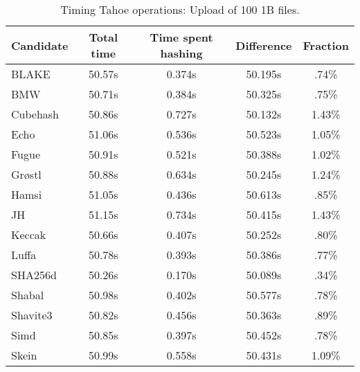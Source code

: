 \begin{table}[h]
  \centering
  \begin{tabular}{ | l | c | c | c | c | }
    \hline
    Candidate & Total time & Time spent hashing & Difference & Fraction \\ \hline
    BLAKE     &  50.57s  &  0.374s  &  50.195s  &  .74\%   \\  \hline
    BMW       &  50.71s  &  0.384s  &  50.325s  &  .75\%   \\  \hline
    Cubehash  &  50.86s  &  0.727s  &  50.132s  &  1.43\%  \\  \hline
    Echo      &  51.06s  &  0.536s  &  50.523s  &  1.05\%  \\  \hline
    Fugue     &  50.91s  &  0.521s  &  50.388s  &  1.02\%  \\  \hline
    Grøstl    &  50.88s  &  0.634s  &  50.245s  &  1.24\%  \\  \hline
    Hamsi     &  51.05s  &  0.436s  &  50.613s  &  .85\%   \\  \hline
    JH        &  51.15s  &  0.734s  &  50.415s  &  1.43\%  \\  \hline
    Keccak    &  50.66s  &  0.407s  &  50.252s  &  .80\%   \\  \hline
    Luffa     &  50.78s  &  0.393s  &  50.386s  &  .77\%   \\  \hline
    SHA256d   &  50.26s  &  0.170s  &  50.089s  &  .34\%   \\  \hline
    Shabal    &  50.98s  &  0.402s  &  50.577s  &  .78\%   \\  \hline
    Shavite3  &  50.82s  &  0.456s  &  50.363s  &  .89\%   \\  \hline
    Simd      &  50.85s  &  0.397s  &  50.452s  &  .78\%   \\  \hline
    Skein     &  50.99s  &  0.558s  &  50.431s  &  1.09\%  \\  \hline
  \end{tabular}
  \caption{Timing Tahoe operations: Upload of 100 1B files.}
  \label{tbl:hashingtimes:put1b}
\end{table}

